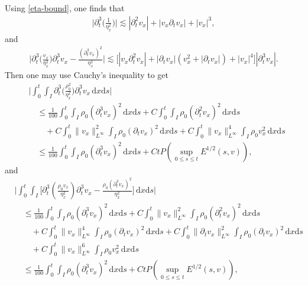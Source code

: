 \documentclass[11pt, reqno]{amsart}
\newcommand{\diff}{\mathrm{d}}
\numberwithin{equation}{section}
\begin{document}
Using \eqref{eta-bound},  one finds that
\begin{equation}\label{Add-1}
\begin{aligned}
\bigg|\partial_t^3\bigg(\frac{1}{\eta_x^2}\bigg)\bigg|\lesssim |\partial_t^2v_x|+|v_x\partial_tv_x|+|v_x|^3,
\end{aligned}
\end{equation}
and
\begin{equation}\label{Add-2}
\begin{aligned}
\bigg|\partial_t^3\bigg(\frac{v_x}{\eta_x^2}\bigg)\partial_t^3v_x
-\frac{(\partial_t^3v_x)^2}{\eta_x^2}\bigg|\lesssim \big[|v_x\partial_t^2v_x|+|\partial_tv_x|(v_x^2+|\partial_tv_x|)+|v_x|^4\big]|\partial_t^3v_x|.
\end{aligned}
\end{equation}
Then one may use Cauchy's inequality to get
\begin{equation}\label{II-Priori-time-2}
\begin{aligned}
&\bigg|\int_0^t\int_I\partial_t^3\bigg({\frac{\rho_0^2}{\eta_x^2}}\bigg)\partial_t^3v_x\,\diff x\diff s\bigg|\\
&\quad\leq \frac{1}{100}\int_0^t\int_I\rho_0(\partial_t^3v_x)^2\,\diff x\diff s
+C\int_0^t\int_I\rho_0(\partial_t^2v_x)^2\,\diff x\diff s\\
&\qquad+C\int_0^t\|v_x\|_{L^\infty}^2\int_I\rho_0(\partial_tv_x)^2\,\diff x\diff s
+C\int_0^t\|v_x\|_{L^\infty}^4\int_I\rho_0v_x^2\,\diff x\diff s\\
&\quad\leq \frac{1}{100}\int_0^t\int_I\rho_0(\partial_t^3v_x)^2\,\diff x\diff s+Ct P(\sup_{0\leq s\leq t}E^{1/2}(s,v)),
\end{aligned}
\end{equation}
and
\begin{equation}\label{II-Priori-time-3}
\begin{aligned}
&\bigg|\int_0^t\int_I\bigg[\partial_t^3(\frac{\rho_0v_x}{\eta_x^2})\partial_t^3v_x
-{\frac{\rho_0(\partial_t^3v_x)^2}{\eta_x^2}}\bigg]\,\diff x\diff s\bigg|\\
&\quad\leq \frac{1}{100}\int_0^t\int_I\rho_0(\partial_t^3v_x)^2\,\diff x\diff s
+C\int_0^t\|v_x\|_{L^\infty}^2\int_I\rho_0(\partial_t^2v_x)^2\,\diff x\diff s\\
&\qquad+C\int_0^t\|v_x\|_{L^\infty}^4\int_I\rho_0(\partial_tv_x)^2\,\diff x\diff s
+C\int_0^t\|\partial_tv_x\|_{L^\infty}^2\int_I\rho_0(\partial_tv_x)^2\,\diff x\diff s\\
&\qquad+C\int_0^t\|v_x\|_{L^\infty}^6\int_I\rho_0v_x^2\,\diff x\diff s\\
&\quad\leq \frac{1}{100}\int_0^t\int_I\rho_0(\partial_t^3v_x)^2\,\diff x\diff s+Ct P(\sup_{0\leq s\leq t}E^{1/2}(s,v)),
\end{aligned}
\end{equation}
\end{document}
